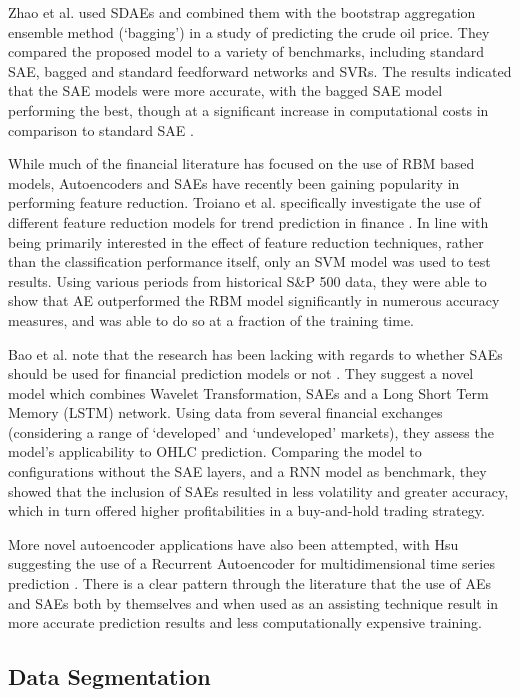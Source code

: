 \documentclass[a4paper,latin]{paper}
\begin{document}
Zhao et al. used SDAEs and combined them with the bootstrap aggregation ensemble method (‘bagging’) in a 
study of predicting the crude oil price. They compared the proposed model to a variety of benchmarks, including 
standard SAE, bagged and standard feedforward networks and SVRs. The results indicated that the SAE models 
were more accurate, with the bagged SAE model performing the best, though at a significant increase in 
computational costs in comparison to standard SAE \cite{Zhao}.
\hfill \break 

While much of the financial literature has focused on the use of RBM based models, Autoencoders and SAEs have 
recently been gaining popularity in performing feature reduction. Troiano et al. specifically investigate the use of 
different feature reduction models for trend prediction in finance \cite{Troiano}. In line with being primarily 
interested in the effect of feature reduction techniques, rather than the classification performance itself, only an 
SVM model was used to test results. Using various periods from historical S\&P 500 data, they were able to show 
that AE outperformed the RBM model significantly in numerous accuracy measures, and was able to do so at a 
fraction of the training time.
\hfill \break 

Bao et al.  note that the research has been lacking with regards to whether SAEs should be used for 
financial prediction models or not \cite{Bao}. They suggest a novel model which combines Wavelet Transformation, SAEs 
and a Long Short Term Memory (LSTM) network. Using data from several financial exchanges (considering a 
range of ‘developed’ and ‘undeveloped’ markets), they assess the model’s applicability to OHLC prediction. 
Comparing the model to configurations without the SAE layers, and a RNN model as benchmark, they showed 
that the inclusion of SAEs resulted in less volatility and greater accuracy, which in turn offered higher profitabilities 
in a buy-and-hold trading strategy.
\hfill \break 

More novel autoencoder applications have also been attempted, with Hsu suggesting the use of a 
Recurrent Autoencoder for multidimensional time series prediction \cite{Hsu}. There is a clear pattern through the literature 
that the use of AEs and SAEs both by themselves and when used as an assisting technique result in more accurate 
prediction results and less computationally expensive training.

\subsection{Data Segmentation}
\hfill
\end{document}
